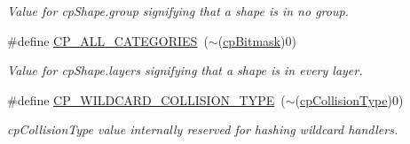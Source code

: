 \begin{DoxyCompactItemize}
\begin{DoxyCompactList}\small\item\em Value for cp\+Shape.\+group signifying that a shape is in no group. \end{DoxyCompactList}\item 
\hypertarget{group__basic_types_ga591693fbd3ed24f3365ef7accf349d4f}{}\#define \hyperlink{group__basic_types_ga591693fbd3ed24f3365ef7accf349d4f}{C\+P\+\_\+\+A\+L\+L\+\_\+\+C\+A\+T\+E\+G\+O\+R\+I\+E\+S}~($\sim$(\hyperlink{group__basic_types_gae7ff94f62e00cae288c1991958822743}{cp\+Bitmask})0)\label{group__basic_types_ga591693fbd3ed24f3365ef7accf349d4f}

\begin{DoxyCompactList}\small\item\em Value for cp\+Shape.\+layers signifying that a shape is in every layer. \end{DoxyCompactList}\item 
\hypertarget{group__basic_types_ga3c81e881eb469ffacbe318a5a991c5bc}{}\#define \hyperlink{group__basic_types_ga3c81e881eb469ffacbe318a5a991c5bc}{C\+P\+\_\+\+W\+I\+L\+D\+C\+A\+R\+D\+\_\+\+C\+O\+L\+L\+I\+S\+I\+O\+N\+\_\+\+T\+Y\+P\+E}~($\sim$(\hyperlink{group__basic_types_gae83e2f50965eb441e36ffff1e32e6d02}{cp\+Collision\+Type})0)\label{group__basic_types_ga3c81e881eb469ffacbe318a5a991c5bc}

\begin{DoxyCompactList}\small\item\em cp\+Collision\+Type value internally reserved for hashing wildcard handlers. \end{DoxyCompactList}\end{DoxyCompactItemize}
